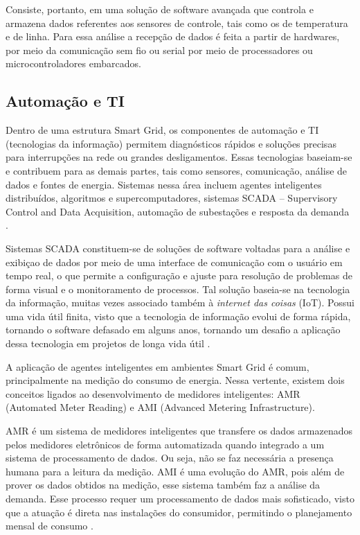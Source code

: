 Consiste, portanto, em uma solução de software avançada que controla e armazena dados referentes aos sensores de controle, tais como os de temperatura e de linha. Para essa análise a recepção de dados é feita a partir de hardwares, por meio da comunicação sem fio ou serial por meio de processadores ou microcontroladores embarcados.


\subsection{Automação e TI}
Dentro de uma estrutura Smart Grid, os componentes de automação e TI (tecnologias da informação) permitem diagnósticos rápidos e soluções precisas para interrupções na rede ou grandes desligamentos. Essas tecnologias baseiam-se e contribuem para as demais partes, tais como sensores, comunicação, análise de dados e fontes de energia. Sistemas nessa área incluem agentes inteligentes distribuídos, algoritmos e supercomputadores, sistemas SCADA – Supervisory Control and Data Acquisition, automação de subestações e resposta da demanda \cite{josesmartgrid}.

Sistemas SCADA constituem-se de soluções de software voltadas para a análise e exibiçao de dados por meio de uma interface de comunicação com o usuário em tempo real, o que permite a configuração e ajuste para resolução de problemas de forma visual e o monitoramento de processos. Tal solução baseia-se na tecnologia da informação, muitas vezes associado também à \textit{internet das coisas} (IoT). Possui uma vida útil finita, visto que a tecnologia de informação evolui de forma rápida, tornando o software defasado em alguns anos, tornando um desafio a aplicação dessa tecnologia em projetos de longa vida útil \cite{galloway2013introduction}.

A aplicação de agentes inteligentes em ambientes Smart Grid é comum, principalmente na medição do consumo de energia. Nessa vertente, existem dois conceitos ligados ao desenvolvimento de medidores inteligentes: AMR (Automated Meter Reading) e AMI (Advanced Metering Infrastructure).

AMR é um sistema de medidores inteligentes que transfere os dados armazenados pelos medidores eletrônicos de forma automatizada quando integrado a um sistema de processamento de dados. Ou seja, não se faz necessária a presença humana para a leitura da medição. AMI é uma evolução do AMR, pois além de prover os dados obtidos na medição, esse sistema também faz a análise da demanda. Esse processo requer um processamento de dados mais sofisticado, visto que a atuação é direta nas instalações do consumidor, permitindo o planejamento mensal de consumo \cite{kup2015estudo}.


